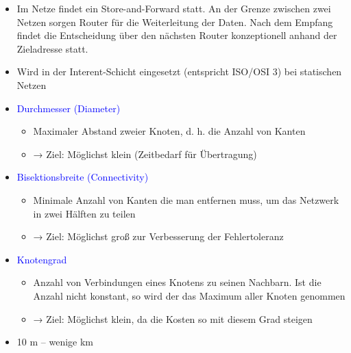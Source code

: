 \begin{itemize}
    \item Im Netze findet ein Store-and-Forward statt.
    An der Grenze zwischen zwei Netzen sorgen Router für die Weiterleitung der Daten.
    Nach dem Empfang findet die Entscheidung über den nächsten Router konzeptionell anhand der Zieladresse statt.
    \item Wird in der Interent-Schicht eingesetzt (entspricht ISO/OSI 3) bei statischen Netzen
\end{itemize}

\begin{itemize}
    \item \textcolor{blue}{Durchmesser (Diameter)}
    \begin{itemize}
        \item Maximaler Abstand zweier Knoten, d. h. die Anzahl von Kanten
        \item → Ziel: Möglichst klein (Zeitbedarf für Übertragung)
    \end{itemize}
    \item \textcolor{blue}{Bisektionsbreite (Connectivity)}
    \begin{itemize}
        \item Minimale Anzahl von Kanten die man entfernen muss, um das Netzwerk in zwei Hälften zu teilen
        \item → Ziel: Möglichst groß zur Verbesserung der Fehlertoleranz
    \end{itemize}
    \item \textcolor{blue}{Knotengrad}
    \begin{itemize}
        \item Anzahl von Verbindungen eines Knotens zu seinen Nachbarn.
        Ist die Anzahl nicht konstant, so wird der das Maximum aller Knoten genommen
        \item → Ziel: Möglichst klein, da die Kosten so mit diesem Grad steigen
    \end{itemize}
\end{itemize}

\begin{itemize}
    \item 10 m – wenige km
\end{itemize}

